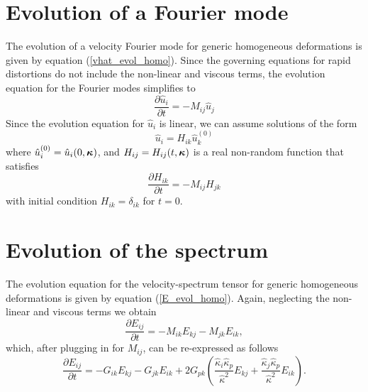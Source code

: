 \documentclass[oneside,a4paper,11pt]{report}
\newcommand{\est}{E}            %
\begin{document}
\section{Evolution of a Fourier mode}

The evolution of a velocity Fourier mode for generic homogeneous deformations is given by equation (\ref{vhat_evol_homo}). Since the governing equations for rapid distortions do not include the non-linear and viscous terms, the evolution equation for the Fourier modes simplifies to
\begin{equation}
\frac{\partial \hat{u}_i}{\partial t} = -M_{ij} \hat{u}_j 
\end{equation}
Since the evolution equation for $\hat{u}_i$ is linear, we can assume solutions of the form
\begin{equation}
\hat{u}_i = H_{ik} \hat{u}_k^{(0)}
\end{equation}
where $\hat{u}_i^{(0)} = \hat{u}_i(0,\boldsymbol\kappa)$, and $H_{ij} = H_{ij}(t,\boldsymbol\kappa)$ is a real non-random function that satisfies
\begin{equation}
\frac{\partial H_{ik}}{\partial t} = - M_{ij} H_{jk}
\end{equation}
with initial condition $H_{ik} = \delta_{ik}$ for $t=0$.

\section{Evolution of the spectrum}

The evolution equation for the velocity-spectrum tensor for generic homogeneous deformations is given by equation (\ref{E_evol_homo}). Again, neglecting the non-linear and viscous terms we obtain
\begin{equation}
\frac{\partial E_{ij}}{\partial t} = -M_{ik} E_{kj} - M_{jk} E_{ik},
\end{equation}
which, after plugging in for $M_{ij}$, can be re-expressed as follows
\begin{equation}
\label{evol_phi}
\frac{\partial \est_{ij}}{\partial t} = -G_{ik} \est_{kj} - G_{jk}\est_{ik} + 2 G_{pk} \left ( \frac{\hat{\kappa}_i \hat{\kappa}_p}{\hat{\kappa}^2} \est_{kj} + \frac{\hat{\kappa}_j \hat{\kappa}_p}{\hat{\kappa}^2} \est_{ik} \right ).
\end{equation}
\end{document}
